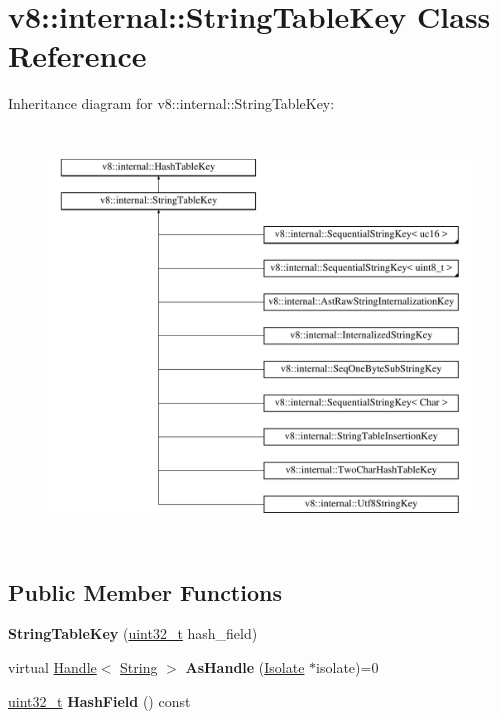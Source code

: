 \hypertarget{classv8_1_1internal_1_1StringTableKey}{}\section{v8\+:\+:internal\+:\+:String\+Table\+Key Class Reference}
\label{classv8_1_1internal_1_1StringTableKey}
Inheritance diagram for v8\+:\+:internal\+:\+:String\+Table\+Key\+:\begin{figure}[H]
\begin{center}
\leavevmode
\includegraphics[height=11.000000cm]{classv8_1_1internal_1_1StringTableKey}
\end{center}
\end{figure}
\subsection*{Public Member Functions}
\begin{DoxyCompactItemize}
\item 
\mbox{\label{classv8_1_1internal_1_1StringTableKey_a719f69b1ed65de38ba8ea599346814e6}} 
{\bfseries String\+Table\+Key} (\mbox{\hyperlink{classuint32__t}{uint32\+\_\+t}} hash\+\_\+field)
\item 
\mbox{\label{classv8_1_1internal_1_1StringTableKey_a1437578e79ad557d9242feda52273379}} 
virtual \mbox{\hyperlink{classv8_1_1internal_1_1Handle}{Handle}}$<$ \mbox{\hyperlink{classv8_1_1internal_1_1String}{String}} $>$ {\bfseries As\+Handle} (\mbox{\hyperlink{classv8_1_1internal_1_1Isolate}{Isolate}} $\ast$isolate)=0
\item 
\mbox{\label{classv8_1_1internal_1_1StringTableKey_aace43d4fa12b7a1b94d89cde03edaae7}} 
\mbox{\hyperlink{classuint32__t}{uint32\+\_\+t}} {\bfseries Hash\+Field} () const
\end{DoxyCompactItemize}
